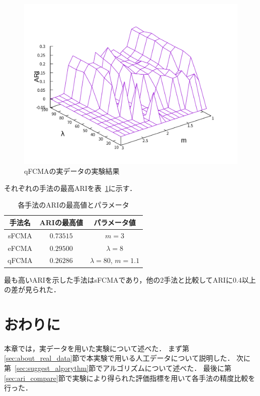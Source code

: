 \documentclass[a4j,12pt,dvipdfmx,oneside]{jsbook}
\theoremstyle{definition}
\begin{document}
\begin{figure}[htbp]
\begin{minipage}{0.43\hsize}
  \includegraphics[width=\linewidth]{qFCMA_ARI.pdf}
  \caption{qFCMAの実データの実験結果}
  \label{fig:qFCMA_ARI}
 \end{minipage}
\end{figure}

それぞれの手法の最高ARIを表~\ref{tbl:max_ari}に示す．

\begin{table}[htbp]
 \centering
 \caption{各手法のARIの最高値とパラメータ}
  \begin{center}
   \begin{tabular}{ c || c | c }\hline
    手法名 & ARIの最高値 & パラメータ値\\ \hline \hline
    sFCMA & $0.73515$ & $m = 3$\\ \hline
    eFCMA & $0.29500$& $\lambda = 8$\\ \hline  
    qFCMA & $0.26286$ & $\lambda = 80$, $m = 1.1$\\  \hline
   \end{tabular}
   \label{tbl:max_ari}
  \end{center}
\end{table}

最も高いARIを示した手法はsFCMAであり，他の$2$手法と比較してARIに$0.4$以上の差が見られた．
 

 \section{おわりに}\label{sec:real_data_summary}
 本章では，実データを用いた実験について述べた．
 まず第\ref{sec:about_real_data}節で本実験で用いる人工データについて説明した．
 次に第~\ref{sec:suggest_algorythm}節でアルゴリズムについて述べた．
 最後に第\ref{sec:ari_compare}節で実験により得られた評価指標を用いて各手法の精度比較を行った．
 
\end{document}
